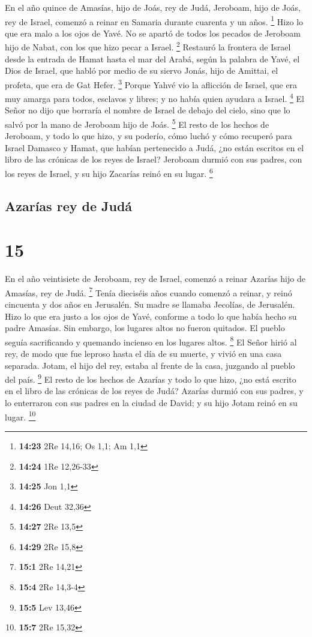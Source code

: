 En el año quince de Amasías, hijo de Joás, rey de Judá,
Jeroboam, hijo de Joás, rey de Israel, comenzó a reinar en Samaria
durante cuarenta y un años. \footnote{\textbf{14:23} 2Re 14,16; Os 1,1;
  Am 1,1}  Hizo lo que era malo a los ojos de Yavé. No se
apartó de todos los pecados de Jeroboam hijo de Nabat, con los que hizo
pecar a Israel. \footnote{\textbf{14:24} 1Re 12,26-33} 
Restauró la frontera de Israel desde la entrada de Hamat hasta el mar
del Arabá, según la palabra de Yavé, el Dios de Israel, que habló por
medio de su siervo Jonás, hijo de Amittai, el profeta, que era de Gat
Hefer. \footnote{\textbf{14:25} Jon 1,1}  Porque Yahvé
vio la aflicción de Israel, que era muy amarga para todos, esclavos y
libres; y no había quien ayudara a Israel. \footnote{\textbf{14:26} Deut
  32,36}  El Señor no dijo que borraría el nombre de
Israel de debajo del cielo, sino que lo salvó por la mano de Jeroboam
hijo de Joás. \footnote{\textbf{14:27} 2Re 13,5}  El
resto de los hechos de Jeroboam, y todo lo que hizo, y su poderío, cómo
luchó y cómo recuperó para Israel Damasco y Hamat, que habían
pertenecido a Judá, ¿no están escritos en el libro de las crónicas de
los reyes de Israel?  Jeroboam durmió con sus padres, con
los reyes de Israel, y su hijo Zacarías reinó en su lugar. \footnote{\textbf{14:29}
  2Re 15,8}

\hypertarget{azaruxedas-rey-de-juduxe1}{%
\subsection{Azarías rey de Judá}\label{azaruxedas-rey-de-juduxe1}}

\hypertarget{section-14}{%
\section{15}\label{section-14}}

 En el año veintisiete de Jeroboam, rey de Israel, comenzó
a reinar Azarías hijo de Amasías, rey de Judá. \footnote{\textbf{15:1}
  2Re 14,21}  Tenía dieciséis años cuando comenzó a
reinar, y reinó cincuenta y dos años en Jerusalén. Su madre se llamaba
Jecolías, de Jerusalén.  Hizo lo que era justo a los ojos
de Yavé, conforme a todo lo que había hecho su padre Amasías.
 Sin embargo, los lugares altos no fueron quitados. El
pueblo seguía sacrificando y quemando incienso en los lugares altos.
\footnote{\textbf{15:4} 2Re 14,3-4}  El Señor hirió al
rey, de modo que fue leproso hasta el día de su muerte, y vivió en una
casa separada. Jotam, el hijo del rey, estaba al frente de la casa,
juzgando al pueblo del país. \footnote{\textbf{15:5} Lev 13,46}
 El resto de los hechos de Azarías y todo lo que hizo, ¿no
está escrito en el libro de las crónicas de los reyes de Judá?
 Azarías durmió con sus padres, y lo enterraron con sus
padres en la ciudad de David; y su hijo Jotam reinó en su lugar.
\footnote{\textbf{15:7} 2Re 15,32}

